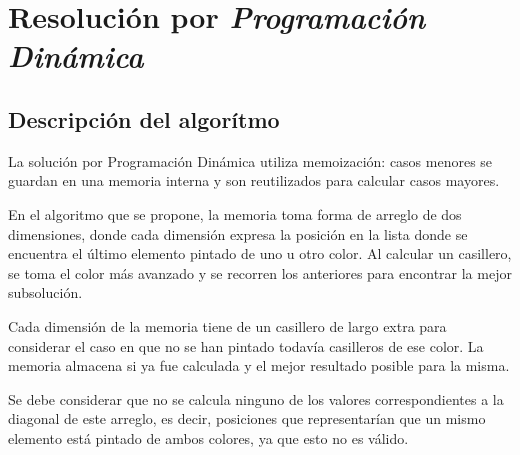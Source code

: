 \section{Resolución por \textit{Programación Dinámica}}
	\subsection{Descripción del algorítmo}

	La solución por Programación Dinámica utiliza memoización: casos menores se guardan en una memoria interna y son reutilizados para calcular casos mayores.

	En el algoritmo que se propone, la memoria toma forma de arreglo de dos dimensiones, donde cada dimensión expresa la posición en la lista donde se encuentra el último elemento pintado de uno u otro color. Al calcular un casillero, se toma el color más avanzado y se recorren los anteriores para encontrar la mejor subsolución.

	Cada dimensión de la memoria tiene de un casillero de largo extra para considerar el caso en que no se han pintado todavía casilleros de ese color. La memoria almacena si ya fue calculada y el mejor resultado posible para la misma.

	Se debe considerar que no se calcula ninguno de los valores correspondientes a la diagonal de este arreglo, es decir, posiciones que representarían que un mismo elemento está pintado de ambos colores, ya que esto no es válido.

